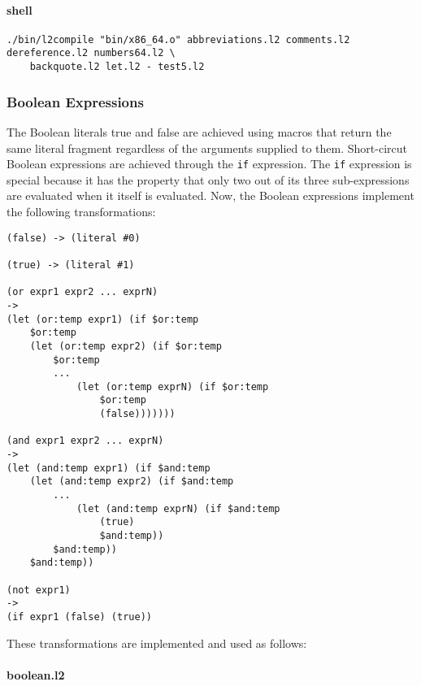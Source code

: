 \documentclass[]{article}
\let\oldparagraph\paragraph
\renewcommand{\paragraph}[1]{\oldparagraph{#1}\mbox{}}
\begin{document}
\hypertarget{shell-4}{%
\paragraph{shell}\label{shell-4}}

\begin{verbatim}
./bin/l2compile "bin/x86_64.o" abbreviations.l2 comments.l2 dereference.l2 numbers64.l2 \
    backquote.l2 let.l2 - test5.l2
\end{verbatim}

\hypertarget{boolean-expressions}{%
\subsubsection{Boolean Expressions}\label{boolean-expressions}}

The Boolean literals true and false are achieved using macros that
return the same literal fragment regardless of the arguments supplied to
them. Short-circut Boolean expressions are achieved through the
\texttt{if} expression. The \texttt{if} expression is special because it
has the property that only two out of its three sub-expressions are
evaluated when it itself is evaluated. Now, the Boolean expressions
implement the following transformations:

\begin{verbatim}
(false) -> (literal #0)

(true) -> (literal #1)

(or expr1 expr2 ... exprN)
->
(let (or:temp expr1) (if $or:temp
    $or:temp
    (let (or:temp expr2) (if $or:temp
        $or:temp
        ...
            (let (or:temp exprN) (if $or:temp
                $or:temp
                (false)))))))

(and expr1 expr2 ... exprN)
->
(let (and:temp expr1) (if $and:temp
    (let (and:temp expr2) (if $and:temp
        ...
            (let (and:temp exprN) (if $and:temp
                (true)
                $and:temp))
        $and:temp))
    $and:temp))

(not expr1)
->
(if expr1 (false) (true))
\end{verbatim}

These transformations are implemented and used as follows:

\hypertarget{boolean.l2}{%
\paragraph{boolean.l2}\label{boolean.l2}}
\end{document}
